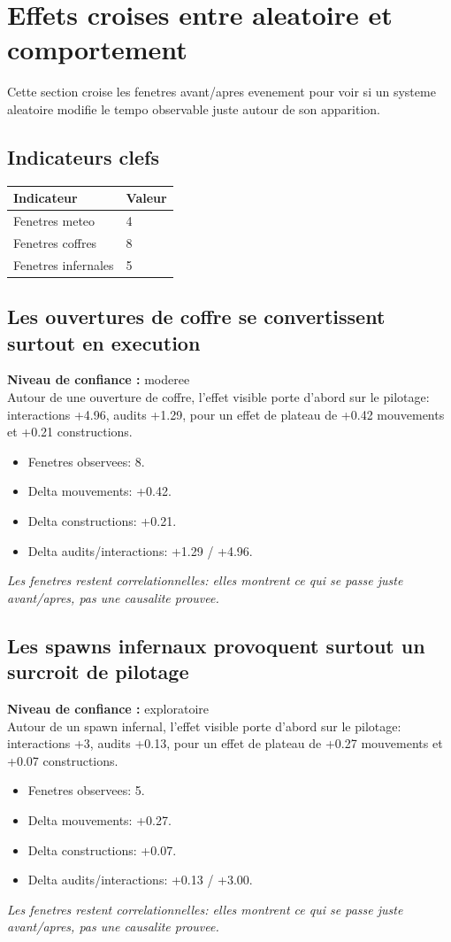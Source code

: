 \documentclass[11pt,a4paper]{article}
\begin{document}
\section{Effets croises entre aleatoire et comportement}
Cette section croise les fenetres avant/apres evenement pour voir si un systeme aleatoire modifie le tempo observable juste autour de son apparition.
\subsection*{Indicateurs clefs}
\begin{tabularx}{\linewidth}{lX}
\toprule
Indicateur & Valeur \\
\midrule
Fenetres meteo & 4 \\
Fenetres coffres & 8 \\
Fenetres infernales & 5 \\
\bottomrule
\end{tabularx}
\subsection*{Les ouvertures de coffre se convertissent surtout en execution}
\textbf{Niveau de confiance :} moderee\\
Autour de une ouverture de coffre, l'effet visible porte d'abord sur le pilotage: interactions +4.96, audits +1.29, pour un effet de plateau de +0.42 mouvements et +0.21 constructions.
\begin{itemize}
\item Fenetres observees: 8.
\item Delta mouvements: +0.42.
\item Delta constructions: +0.21.
\item Delta audits/interactions: +1.29 / +4.96.
\end{itemize}
\textit{Les fenetres restent correlationnelles: elles montrent ce qui se passe juste avant/apres, pas une causalite prouvee.}
\subsection*{Les spawns infernaux provoquent surtout un surcroit de pilotage}
\textbf{Niveau de confiance :} exploratoire\\
Autour de un spawn infernal, l'effet visible porte d'abord sur le pilotage: interactions +3, audits +0.13, pour un effet de plateau de +0.27 mouvements et +0.07 constructions.
\begin{itemize}
\item Fenetres observees: 5.
\item Delta mouvements: +0.27.
\item Delta constructions: +0.07.
\item Delta audits/interactions: +0.13 / +3.00.
\end{itemize}
\textit{Les fenetres restent correlationnelles: elles montrent ce qui se passe juste avant/apres, pas une causalite prouvee.}
\end{document}
